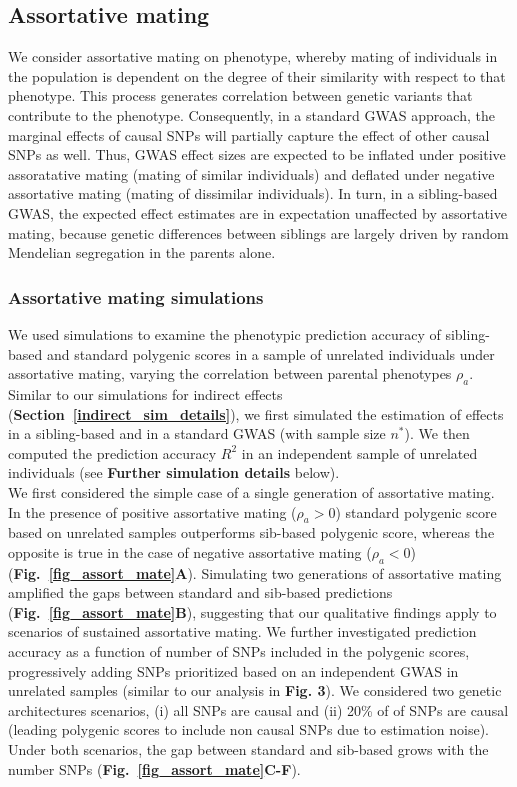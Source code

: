 \documentclass[hidelinks, 12pt]{article}
\begin{document}
\pagebreak

\subsection{Assortative mating}
We consider assortative mating on phenotype, whereby mating of individuals in the population is dependent on the degree of their similarity with respect to that phenotype.  This process generates correlation between genetic variants that contribute to the phenotype.  Consequently, in a standard GWAS approach, the marginal effects of causal SNPs will partially capture the effect of other causal SNPs as well. Thus, GWAS effect sizes are expected to be inflated under positive assoratative mating (mating of similar individuals) and deflated under negative assortative mating (mating of dissimilar individuals). In turn, in a sibling-based GWAS, the expected effect estimates are in expectation unaffected by assortative mating, because genetic differences between siblings are largely driven by random Mendelian segregation in the parents alone. 

\subsubsection{Assortative mating simulations}
We used simulations to examine the phenotypic prediction accuracy of sibling-based and standard polygenic scores in a sample of unrelated individuals under assortative mating, varying the correlation between parental phenotypes $\rho_a$. Similar to our simulations for indirect effects ({\bf Section~\ref{indirect_sim_details}}), we first simulated the estimation of effects in a sibling-based and in a standard GWAS (with sample size $n^*$). We then computed the prediction accuracy $R^2$ in an independent sample of unrelated individuals (see {\bf Further simulation details} below).\\

We first considered the simple case of a single generation of assortative mating. In the presence of positive assortative mating ($\rho_a>0$) standard polygenic score based on unrelated samples outperforms sib-based polygenic score, whereas the opposite is true in the case of negative assortative mating ($\rho_a<0$) ({\bf Fig.~\ref{fig_assort_mate}A}). Simulating two generations of assortative mating amplified the gaps between standard and sib-based predictions ({\bf Fig.~\ref{fig_assort_mate}B}), suggesting that our qualitative findings apply to scenarios of sustained assortative mating. We further investigated prediction accuracy as a function of number of SNPs included in the polygenic scores, progressively adding SNPs prioritized based on an independent GWAS in unrelated samples (similar to our analysis in {\bf Fig. 3}). We considered two genetic architectures scenarios, (i) all SNPs are causal and (ii) 20\% of of SNPs are causal (leading polygenic scores to include non causal SNPs due to estimation noise). Under both scenarios, the gap between standard and sib-based grows with the number SNPs ({\bf Fig.~\ref{fig_assort_mate}C-F}).\\
\end{document}

